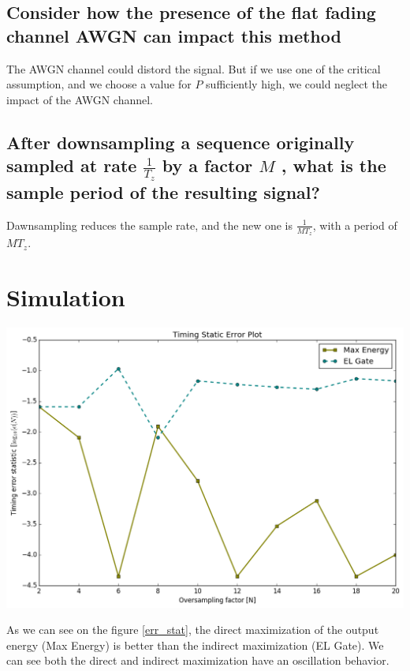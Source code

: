\documentclass[frenchb, oneside, headings=normal]{scrartcl}
\begin{document}
\subsection{Consider how the presence of the flat fading channel AWGN can impact this method}

The AWGN channel could distord the signal. But if we use one of the critical assumption, and we choose a value for $P$ sufficiently high, we could neglect the impact of the AWGN channel.

\subsection{After downsampling a sequence originally sampled at rate $\frac{1}{T_z}$ by a factor $M$ , what is the sample period of the resulting signal?}

Dawnsampling reduces the sample rate, and the new one is $\frac{1}{MT_z}$, with a period of $MT_z$.

\section{Simulation}

\begin{center}
\includegraphics[width=.9\textwidth]{img/index}
\label{err_stat}
\end{center}

As we can see on the figure \ref{err_stat}, the direct maximization of the output energy (Max Energy) is better than the indirect maximization (EL Gate). We can see both the direct and indirect maximization have an oscillation behavior.
\end{document}
